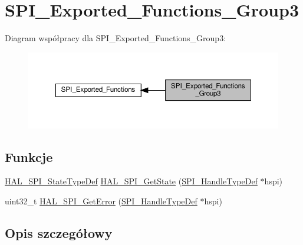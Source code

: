 \hypertarget{group___s_p_i___exported___functions___group3}{}\section{S\+P\+I\+\_\+\+Exported\+\_\+\+Functions\+\_\+\+Group3}
\label{group___s_p_i___exported___functions___group3}
Diagram współpracy dla S\+P\+I\+\_\+\+Exported\+\_\+\+Functions\+\_\+\+Group3\+:\nopagebreak
\begin{figure}[H]
\begin{center}
\leavevmode
\includegraphics[width=350pt]{group___s_p_i___exported___functions___group3}
\end{center}
\end{figure}
\subsection*{Funkcje}
\begin{DoxyCompactItemize}
\item 
\hyperlink{group___s_p_i___exported___types_ga8891cb64e76198a860172d94c638c9b4}{H\+A\+L\+\_\+\+S\+P\+I\+\_\+\+State\+Type\+Def} \hyperlink{group___s_p_i___exported___functions___group3_ga4e599e7fac80bb2eb0fd3f1737e50a5e}{H\+A\+L\+\_\+\+S\+P\+I\+\_\+\+Get\+State} (\hyperlink{group___s_p_i___exported___types_gab3bd115785297692c125528b7293566b}{S\+P\+I\+\_\+\+Handle\+Type\+Def} $\ast$hspi)
\item 
uint32\+\_\+t \hyperlink{group___s_p_i___exported___functions___group3_ga7f4d30dc380760d19ee4c582b91ed7f6}{H\+A\+L\+\_\+\+S\+P\+I\+\_\+\+Get\+Error} (\hyperlink{group___s_p_i___exported___types_gab3bd115785297692c125528b7293566b}{S\+P\+I\+\_\+\+Handle\+Type\+Def} $\ast$hspi)
\end{DoxyCompactItemize}


\subsection{Opis szczegółowy}


